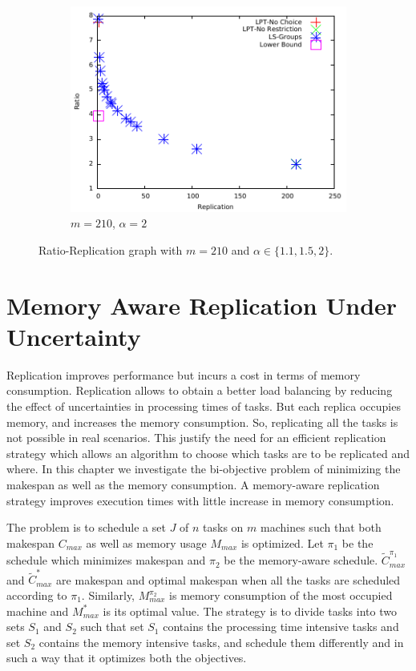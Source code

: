 \documentclass[twocolumn]{svjour3}
\begin{document}
\begin {figure}
  \begin{subfigure}[b]{0.5\textwidth}
    \includegraphics[width=\textwidth]{alpha_2.pdf}
    \caption{$m=210$, $\alpha=2$}
    \label{fig:3}
  \end{subfigure} %

  \caption{Ratio-Replication graph with $m=210$ and $\alpha \in \{1.1, 1.5, 2\}$.}
  \label{fig:Graph}
\end{figure}


\newpage

\section{Memory Aware Replication Under Uncertainty}\label{ch5}
   
   
Replication improves performance but incurs a cost in terms of memory
consumption.  Replication allows to obtain a better load balancing by
reducing the effect of uncertainties in processing times of tasks. But
each replica occupies memory, and increases the memory consumption.
So, replicating all the tasks is not possible in real scenarios. This
justify the need for an efficient replication strategy which allows an
algorithm to choose which tasks are to be replicated and where.  In
this chapter we investigate the bi-objective problem of minimizing the
makespan as well as the memory consumption. A memory-aware replication
strategy improves execution times with little increase in memory
consumption.
   
The problem is to schedule a set $J$ of $n$ tasks on $m$ machines such
that both makespan $C_{max}$ as well as memory usage $M_{max}$ is
optimized.  Let $\pi_1$ be the schedule which minimizes makespan and
$\pi_2$ be the memory-aware schedule. $\tilde{C}^{\pi_1}_{max}$ and
$\tilde{C}^{*}_{max}$ are makespan and optimal makespan when all the
tasks are scheduled according to $\pi_1$. Similarly, $M^{\pi_2}_{max}$
is memory consumption of the most occupied machine and $M^*_{max}$ is
its optimal value. The strategy is to divide tasks into two sets $S_1$
and $S_2$ such that set $S_1$ contains the processing time intensive
tasks and set $S_2$ contains the memory intensive tasks, and schedule
them differently and in such a way that it optimizes both the
objectives.
     
\end{document}

